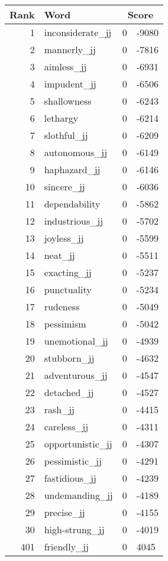 \begin{longtable}[!htbp]{| rlr@{.}l |}
    \hline
    \textbf{Rank} & \textbf{Word} & \multicolumn{2}{c|}{\textbf{Score}} \\
    \hline
    \endhead
    1 & inconsiderate\_jj & 0 & -9080 \\
    2 & mannerly\_jj & 0 & -7816 \\
    3 & aimless\_jj & 0 & -6931 \\
    4 & impudent\_jj & 0 & -6506 \\
    5 & shallowness & 0 & -6243 \\
    6 & lethargy & 0 & -6214 \\
    7 & slothful\_jj & 0 & -6209 \\
    8 & autonomous\_jj & 0 & -6149 \\
    9 & haphazard\_jj & 0 & -6146 \\
    10 & sincere\_jj & 0 & -6036 \\
    11 & dependability & 0 & -5862 \\
    12 & industrious\_jj & 0 & -5702 \\
    13 & joyless\_jj & 0 & -5599 \\
    14 & neat\_jj & 0 & -5511 \\
    15 & exacting\_jj & 0 & -5237 \\
    16 & punctuality & 0 & -5234 \\
    17 & rudeness & 0 & -5049 \\
    18 & pessimism & 0 & -5042 \\
    19 & unemotional\_jj & 0 & -4939 \\
    20 & stubborn\_jj & 0 & -4632 \\
    21 & adventurous\_jj & 0 & -4547 \\
    22 & detached\_jj & 0 & -4527 \\
    23 & rash\_jj & 0 & -4415 \\
    24 & careless\_jj & 0 & -4311 \\
    25 & opportunistic\_jj & 0 & -4307 \\
    26 & pessimistic\_jj & 0 & -4291 \\
    27 & fastidious\_jj & 0 & -4239 \\
    28 & undemanding\_jj & 0 & -4189 \\
    29 & precise\_jj & 0 & -4155 \\
    30 & high-strung\_jj & 0 & -4019 \\
    401 & friendly\_jj & 0 & 4045 \\

\end{longtable}
